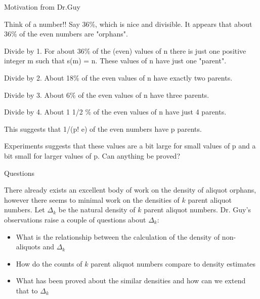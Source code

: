\documentclass{beamer}
\begin{document}
\begin{frame}{Motivation from Dr.Guy}

\small{Think of a number!! Say 36\%, which is nice and divisible. It appears that about 36\% of the even numbers are "orphans". \linebreak

Divide by 1. For about 36\% of the (even) values of n there is just one positive integer m such that s(m) = n. These values of n have just one "parent". \linebreak

Divide by 2.  About 18\% of the even values of n have exactly two parents. \linebreak

Divide by 3. About 6\% of the even values of n have three parents. \linebreak

Divide by 4. About 1 1/2 \% of the even values of n have just 4 parents.  \linebreak

This suggests that 1/(p! e) of the even numbers have p parents.\linebreak

Experiments suggests that these values are a bit large for small values of p and a bit small for larger values of p. Can anything be proved?\\}
\end{frame}

\begin{frame}{Questions}

There already exists an excellent body of work on the density of aliquot orphans, however there seems to minimal work on the densities of $k$ parent aliquot numbers.  \linebreak \linebreak
Let $\Delta_k$ be the natural density of $k$ parent aliquot numbers.\linebreak \linebreak
Dr. Guy's observations raise a couple of questions about $\Delta_k$:
\begin{itemize}
    \item What is the relationship between the calculation of the density of non-aliquots and $\Delta_k$
    \item How do the counts of $k$ parent aliquot numbers compare to density estimates
    \item What has been proved about the similar densities and how can we extend that to $\Delta_k$
\end{itemize}
\end{frame}
\end{document}

